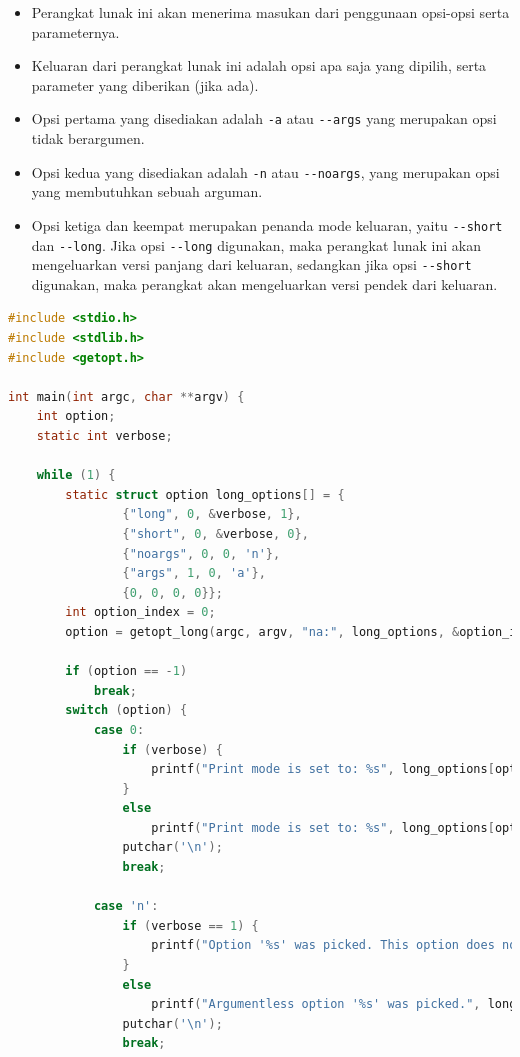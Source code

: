 \documentclass[a4paper,twoside]{article}
\begin{document}
\begin{enumerate}
\begin{itemize}
	\item Perangkat lunak ini akan menerima masukan dari penggunaan opsi-opsi serta parameternya.
	\item Keluaran dari perangkat lunak ini adalah opsi apa saja yang dipilih, serta parameter yang diberikan (jika ada).
	\item Opsi pertama yang disediakan adalah \verb|-a| atau \verb|--args| yang merupakan opsi tidak berargumen.
	\item Opsi kedua yang disediakan adalah \verb|-n| atau \verb|--noargs|, yang merupakan opsi yang membutuhkan sebuah arguman.
	\item Opsi ketiga dan keempat merupakan penanda mode keluaran, yaitu \verb|--short| dan \verb|--long|. Jika opsi \verb|--long| digunakan, maka perangkat lunak ini akan mengeluarkan versi panjang dari keluaran, sedangkan jika opsi \verb|--short| digunakan, maka perangkat akan mengeluarkan versi pendek dari keluaran.
\end{itemize}

\begin{lstlisting}[language=C, caption=Contoh sederhana penggunaan getopt-long, label=code:getopt-usage-long]
#include <stdio.h>
#include <stdlib.h>
#include <getopt.h>

int main(int argc, char **argv) {
    int option;
    static int verbose;

    while (1) {
        static struct option long_options[] = {
                {"long", 0, &verbose, 1},
                {"short", 0, &verbose, 0},
                {"noargs", 0, 0, 'n'},
                {"args", 1, 0, 'a'},
                {0, 0, 0, 0}};
        int option_index = 0;
        option = getopt_long(argc, argv, "na:", long_options, &option_index);

        if (option == -1)
            break;
        switch (option) {
	        case 0:
    	        if (verbose) {
	                printf("Print mode is set to: %s", long_options[option_index].name);
	            }
	            else
	                printf("Print mode is set to: %s", long_options[option_index].name);
	            putchar('\n');
	            break;

    	    case 'n':
	            if (verbose == 1) {
	                printf("Option '%s' was picked. This option does not require any arguments.", long_options[option_index].name);
    	        }
	            else
	                printf("Argumentless option '%s' was picked.", long_options[option_index].name);
	            putchar('\n');
	            break;


\end{lstlisting}
\end{enumerate}
\end{document}
